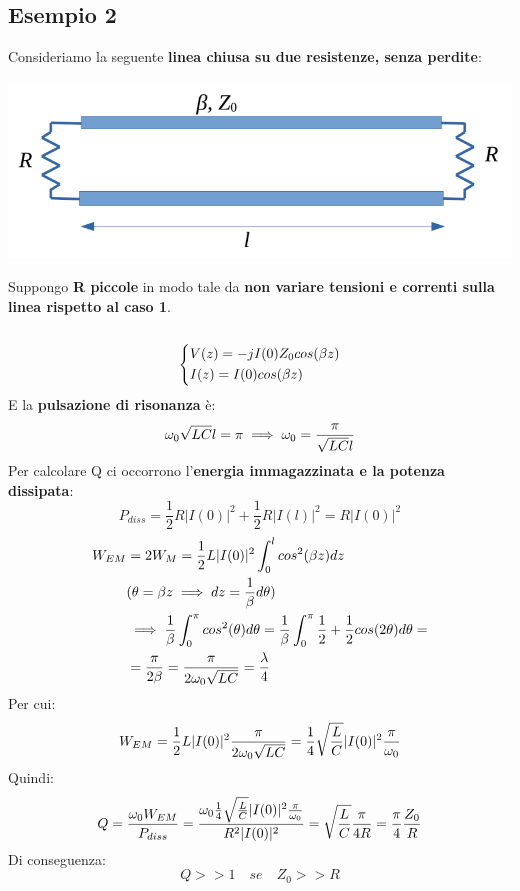 \subsection{Esempio 2}
Consideriamo la seguente \textbf{linea chiusa su due resistenze, senza perdite}:
\begin{center}
    \includegraphics[width=.8\textwidth]{Images/figure29.png}
\end{center}
Suppongo \textbf{R piccole} in modo tale da \textbf{non variare tensioni e correnti sulla linea rispetto al caso 1}.\\ \\
\begin{equation*}
    \begin{dcases}
    V(z) = -j I(0) Z_0 cos(\beta z)\\
    I(z) = I(0) cos(\beta z) 
    \end{dcases}
\end{equation*}
E la \textbf{pulsazione di risonanza} è:
\begin{equation*}
    \omega_0\sqrt{LC} l = \pi \implies \omega_0 = \frac{\pi}{\sqrt{LC} l }
\end{equation*}
Per calcolare Q ci occorrono l'\textbf{energia immagazzinata e la potenza dissipata}:
\begin{equation*}
    P_{diss} = \frac{1}{2} R |I(0)|^2 + \frac{1}{2} R |I(l)|^2 = R |I(0)|^2
\end{equation*}
\begin{equation*}
\begin{aligned}
    W_{EM} &= 2W_M = \frac{1}{2} L |I(0)|^2 \int_0^l cos^2(\beta z) dz \\
    &(\theta = \beta z \implies dz = \frac{1}{\beta} d\theta)\\
    &\implies \frac{1}{\beta} \int_0^\pi cos^2(\theta) d\theta = \frac{1}{\beta} \int_0^\pi \frac{1}{2} + \frac{1}{2} cos(2\theta) d\theta =\\
    &= \frac{\pi}{2\beta} = \frac{\pi}{2\omega_0 \sqrt{LC}} = \frac{\lambda}{4}
\end{aligned}
\end{equation*}
Per cui:
\begin{equation*}
    W_{EM} = \frac{1}{2} L |I(0)|^2 \frac{\pi}{2\omega_0 \sqrt{LC}} = \frac{1}{4} \sqrt{\frac{L}{C}} |I(0)|^2 \frac{\pi}{\omega_0}
\end{equation*}
Quindi:
\begin{equation*}
    Q = \frac{\omega_0 W_{EM}}{P_{diss}} = \frac{\omega_0 \frac{1}{4} \sqrt{\frac{L}{C}} |I(0)|^2 \frac{\pi}{\omega_0}}{R^2 |I(0)|^2} = \sqrt{\frac{L}{C}} \frac{\pi}{4R} = \frac{\pi}{4} \frac{Z_0}{R}
\end{equation*}
Di conseguenza:
\begin{equation*}
    Q >> 1 \quad se \quad Z_0 >> R
\end{equation*}

